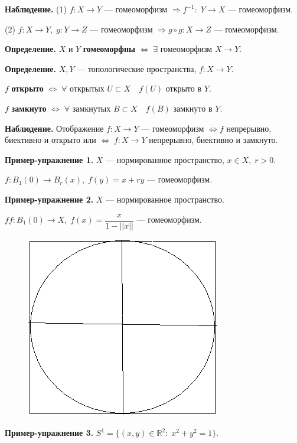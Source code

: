 \documentclass[12pt,a4paper]{article}
\begin{document}
\textbf{Наблюдение.} (1) $f: X \to Y$ --- гомеоморфизм $\Rightarrow f^{-1}: \; Y \to X$ --- гомеоморфизм. 

(2) $f: X \to Y, \; g: Y \to Z$ --- гомеоморфизм $\Rightarrow g \circ g: X \to Z$ --- гомеоморфизм. 

\textbf{Определение.} $X$ и $Y$ \textbf{гомеоморфны} $\Leftrightarrow \; \exists$ гомеоморфизм $X \to Y.$ 

\textbf{Определение.} $X, Y$ --- топологические пространства, $f: X \to Y.$ 

$f$ \textbf{открыто} $\Leftrightarrow \; \forall$ открытых $U \subset X \quad f(U)$ открыто в $Y.$ 

$f$ \textbf{замкнуто} $\Leftrightarrow \; \forall$ замкнутых $B \subset X \quad f(B)$ замкнуто в $Y.$ 

\textbf{Наблюдение.} Отображение $f: X \to Y$ --- гомеоморфизм $\Leftrightarrow f$ непрерывно, биективно и открыто или $\Leftrightarrow \; f: X \to Y$ непрерывно, биективно и замкнуто.

\textbf{Пример-упражнение 1.} $X$ --- нормированное пространство, $x \in X, \; r > 0.$ 

$f: B_{1}(0) \to B_{r}(x), \; f(y) = x + ry$ --- гомеоморфизм. 

\textbf{Пример-упражнение 2.} $X$ --- нормированное пространство. 

$ff: B_{1}(0) \to X, \; f(x) = \dfrac{x}{1 - ||x||}$ --- гомеоморфизм. 

\begin{figure}
	\includegraphics[width=0.7\linewidth]{lect5_2.png}
\end{figure}

\textbf{Пример-упражнение 3.} $S^{1} = \{(x, y) \in \mathbb{R}^{2}: \; x^{2} + y^{2} = 1\}.$ 
\end{document}
